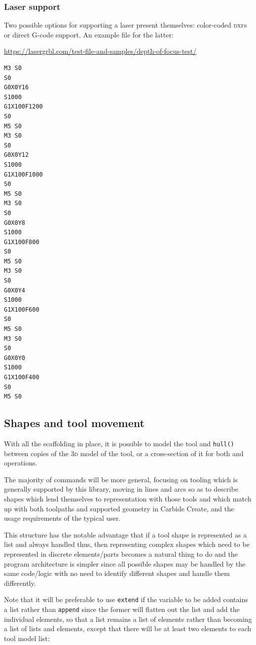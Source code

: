\documentclass{ltxdoc}
\begin{document}
\subsubsection{Laser support}

Two possible options for supporting a laser present themselves: color-coded \textsc{dxf}s or direct G-code support. An example file for the latter:

\url{https://lasergrbl.com/test-file-and-samples/depth-of-focus-test/}

\begin{verbatim}
M3 S0
S0 
G0X0Y16
S1000 
G1X100F1200
S0 
M5 S0
M3 S0
S0 
G0X0Y12
S1000 
G1X100F1000
S0 
M5 S0
M3 S0
S0 
G0X0Y8
S1000 
G1X100F800
S0 
M5 S0
M3 S0
S0 
G0X0Y4
S1000 
G1X100F600
S0 
M5 S0
M3 S0
S0 
G0X0Y0
S1000 
G1X100F400
S0 
M5 S0
\end{verbatim}

\subsection{Shapes and tool movement}

With all the scaffolding in place, it is possible to model the tool and \verb|hull()| between copies of the \textsc{3d} model of the tool, or a cross-section of it for both  and  operations.

The majority of commands will be more general, focusing on tooling which is generally supported by this library, moving in lines and arcs so as to describe shapes which lend themselves to representation with those tools and which match up with both toolpaths and supported geometry in Carbide Create, and the usage requirements of the typical user.

This structure has the notable advantage that if a tool shape is represented as a list and always handled thus, then representing complex shapes which need to be represented in discrete elements/parts becomes a natural thing to do and the program architecture is simpler since all possible shapes may be handled by the same code/logic with no need to identify different shapes and handle them differently.

Note that it will be preferable to use \verb|extend| if the variable to be added contains a list rather than \verb|append| since the former will flatten out the list and add the individual elements, so that a list remains a list of elements rather than becoming a list of lists and elements, except that there will be at least two elements to each tool model list:
\end{document}
